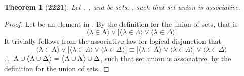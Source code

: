 \documentclass[preview]{standalone}
\newtheorem*{theorem*}{Theorem}
\begin{document}
\begin{theorem*}[\textbf{2221}] \color{black}
    Let , \bm{$\Lambda$}, and \bm{$\Delta$} be sets. 
    , 
    such that set union is associative.
\end{theorem*}
\begin{proof} \color{black}
    Let \bm{$\lambda$} be an element in 
    . 
    By the definition for the union of sets, that is
    \begin{equation*}
        \Big \langle \lambda \in \mathrm{A} \Big \rangle
            \lor
        \bigg[
            \Big \langle \lambda \in \Lambda \Big \rangle
                \lor
            \Big \langle \lambda \in \Delta \Big \rangle
        \bigg]
    \end{equation*}
    It trivially follows from the associative law for logical disjunction that
    \begin{equation*}
        \Big \langle \lambda \in \mathrm{A} \Big \rangle
            \lor
        \bigg[
            \Big \langle \lambda \in \Lambda \Big \rangle
                \lor
            \Big \langle \lambda \in \Delta \Big \rangle
        \bigg]
            \equiv
        \bigg[
            \Big \langle \lambda \in \mathrm{A} \Big \rangle
                \lor
            \Big \langle \lambda \in \Lambda \Big \rangle
        \bigg]
            \lor
        \Big \langle \lambda \in \Delta \Big \rangle
    \end{equation*}
    $\therefore \text{\space} \relax{
    \mathrm{A} 
        \cup 
    \big \langle \Lambda \cup \Delta \big \rangle 
        = 
    \big \langle \mathrm{A} \cup \Lambda \big \rangle 
        \cup 
    \Delta
    }$, 
    such that set union is associative.
    by the definition for the union of sets.
\color{lightgray} \end{proof}
\end{document}
